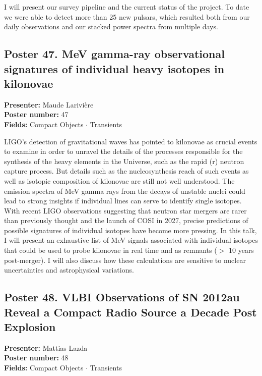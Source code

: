 I will present our survey pipeline and the current status of the project. To date we were able to detect more than 25 new pulsars, which resulted both from our daily observations and our stacked power spectra from multiple days.

\hypertarget{poster-abstract-talk-324}{}\label{poster-abstract-page-talk-324}
\subsection*{Poster 47. MeV gamma-ray observational signatures of individual heavy isotopes in kilonovae}
\textbf{Presenter:} Maude Larivière\\
\textbf{Poster number:} 47\\
\textbf{Fields:} Compact Objects $\cdot$ Transients

LIGO's detection of gravitational waves has pointed to kilonovae as crucial events to examine in order to unravel the details of the processes responsible for the synthesis of the heavy elements in the Universe, such as the rapid (r) neutron capture process. But details such as the nucleosynthesis reach of such events as well as isotopic composition of kilonovae are still not well understood. The emission spectra of MeV gamma rays from the decays of unstable nuclei could lead to strong insights if individual lines can serve to identify single isotopes. With recent LIGO observations suggesting that neutron star mergers are rarer than previously thought and the launch of COSI in 2027, precise predictions of possible signatures of individual isotopes have become more pressing. In this talk, I will present an exhaustive list of MeV signals associated with individual isotopes that could be used to probe kilonovae in real time and as remnants ($>$ 10 years post-merger). I will also discuss how these calculations are sensitive to nuclear uncertainties and astrophysical variations.

\hypertarget{poster-abstract-talk-191}{}\label{poster-abstract-page-talk-191}
\subsection*{Poster 48. VLBI Observations of SN 2012au Reveal a Compact Radio Source a Decade Post Explosion}
\textbf{Presenter:} Mattias Lazda\\
\textbf{Poster number:} 48\\
\textbf{Fields:} Compact Objects $\cdot$ Transients

